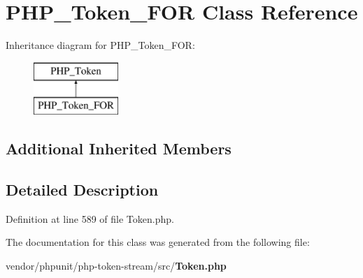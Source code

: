 \section{P\+H\+P\+\_\+\+Token\+\_\+\+F\+O\+R Class Reference}
\label{class_p_h_p___token___f_o_r}
Inheritance diagram for P\+H\+P\+\_\+\+Token\+\_\+\+F\+O\+R\+:\begin{figure}[H]
\begin{center}
\leavevmode
\includegraphics[height=2.000000cm]{class_p_h_p___token___f_o_r}
\end{center}
\end{figure}
\subsection*{Additional Inherited Members}


\subsection{Detailed Description}


Definition at line 589 of file Token.\+php.



The documentation for this class was generated from the following file\+:\begin{DoxyCompactItemize}
\item 
vendor/phpunit/php-\/token-\/stream/src/{\bf Token.\+php}\end{DoxyCompactItemize}
